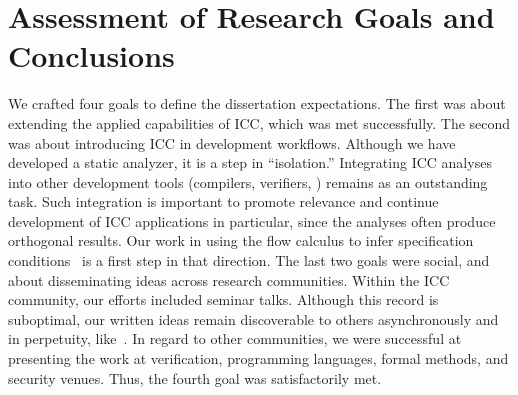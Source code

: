 
\section{Assessment of Research Goals and Conclusions}
\label{sec:res-summary}

We crafted four goals to define the dissertation expectations.
The first was about extending the applied capabilities of ICC, which was met successfully.
The second was about introducing ICC in development workflows.
Although we have developed a static analyzer, it is a step in \enquote{isolation.}
Integrating ICC analyses into other development tools (compilers, verifiers, \etc) remains as an outstanding task.
Such integration is important to promote relevance and continue development of ICC {applications}
in particular, since the analyses often produce orthogonal results.
Our work in using the flow calculus to infer specification conditions~\cite{rusch2025} is a first step in that direction.
The last two goals were social, and about disseminating ideas across research communities.
Within the ICC community, our efforts included seminar talks.
Although this record is suboptimal, our written ideas remain discoverable to others asynchronously and in perpetuity, like~\cite{moyen2017}.
In regard to other communities, we were successful at presenting the work at verification, programming languages, formal methods, and security venues.
Thus, the fourth goal was satisfactorily met.


